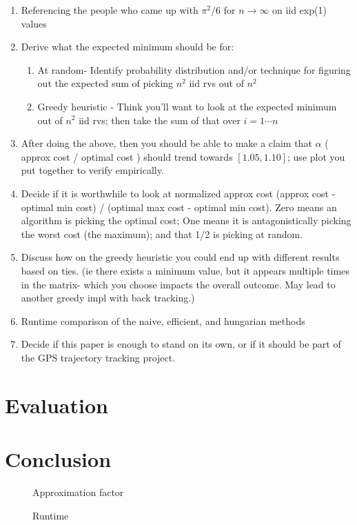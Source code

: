 \documentclass{article}
\begin{document}
\begin{enumerate}
	\item Referencing the people who came up with $\pi^2/6$ for $n \to \infty$ on iid exp(1) values
	\item Derive what the expected minimum should be for:
	\begin{enumerate}
		\item At random- Identify probability distribution and/or technique for figuring out the expected sum of picking $n^2$ iid rvs out of $n^2$
		\item Greedy heuristic - Think you'll want to look at the expected minimum out of $n^2$ iid rvs; then take the sum of that over $i = 1 \cdots n$
	\end{enumerate}
	\item After doing the above, then you should be able to make a claim that $\alpha$ ( approx cost / optimal cost ) should trend towards $[1.05, 1.10]$; use plot you put together to verify empirically. 
	\item Decide if it is worthwhile to look at normalized approx cost (approx cost - optimal min cost) / (optimal max cost - optimal min cost). Zero means an algorithm is picking the optimal cost; One means it is antagonistically picking the worst cost (the maximum); and that 1/2 is picking at random.
	\item Discuss how on the greedy heuristic you could end up with different results based on ties. (ie there exists a minimum value, but it appears multiple times in the matrix- which you choose impacts the overall outcome. May lead to another greedy impl with back tracking.)
	\item Runtime comparison of the naive, efficient, and hungarian methods

	\item Decide if this paper is enough to stand on its own, or if it should be part of the GPS trajectory tracking project.

\end{enumerate}

\section{Evaluation}

\section{Conclusion}

\begin{figure}
	\centering
	\caption{Approximation factor}
	
	\label{fig:approximationFactor}
\end{figure}

\begin{figure}
	\centering
	\caption{Runtime}
	
	\label{fig:runtime}
\end{figure}
\end{document}
